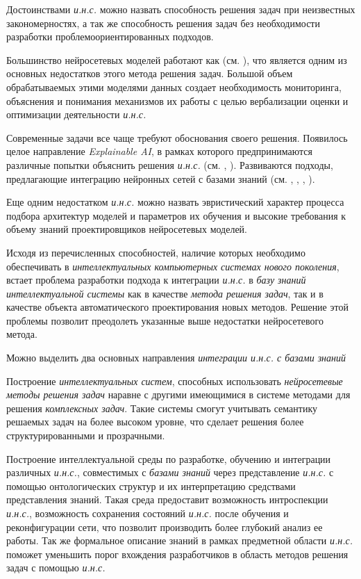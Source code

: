 Достоинствами \textit{и.н.с.} можно назвать способность решения задач при неизвестных закономерностях, а так же способность решения задач без необходимости разработки проблемоориентированных подходов.

Большинство нейросетевых моделей работают как  (см. ), что является одним из основных недостатков этого метода решения задач. Большой объем обрабатываемых этими моделями данных создает необходимость мониторинга, объяснения и понимания механизмов их работы с целью вербализации оценки и оптимизации деятельности \textit{и.н.с.}

Современные задачи все чаще требуют обоснования своего решения. Появилось целое направление \textit{Explainable AI}, в рамках которого предпринимаются различные попытки объяснить решения \textit{и.н.с.} (см. , ). Развиваются подходы, предлагающие интеграцию нейронных сетей с базами знаний (см. , , , ).

Еще одним недостатком \textit{и.н.с.} можно назвать эвристический характер процесса подбора архитектур моделей и параметров их обучения и высокие требования к объему знаний проектировщиков нейросетевых моделей.

Исходя из перечисленных способностей, наличие которых необходимо обеспечивать в \textit{интеллектуальных компьютерных системах нового поколения}, встает проблема разработки подхода к интеграции \textit{и.н.с.} в \textit{базу знаний} \textit{интеллектуальной системы} как в качестве \textit{метода решения задач}, так и в качестве объекта автоматического проектирования новых методов. Решение этой проблемы позволит преодолеть указанные выше недостатки нейросетевого метода.

Можно выделить два основных направления \textit{интеграции и.н.с. с базами знаний} \:
\begin{textitemize}
	\item Построение \textit{интеллектуальных систем}, способных использовать \textit{нейросетевые методы решения задач} наравне с другими имеющимися в системе методами для решения \textit{комплексных задач}. Такие системы смогут учитывать семантику решаемых задач на более высоком уровне, что сделает решения более структурированными и прозрачными.
	\item Построение интеллектуальной среды по разработке, обучению и интеграции различных \textit{и.н.с.}, совместимых с \textit{базами знаний} через представление \textit{и.н.с.} с помощью онтологических структур и их интерпретацию средствами представления знаний. Такая среда предоставит возможность интроспекции \textit{и.н.с.}, возможность сохранения состояний \textit{и.н.с.} после обучения и реконфигурации сети, что позволит производить более глубокий анализ ее работы. Так же формальное описание знаний в рамках предметной области \textit{и.н.с.} поможет уменьшить порог вхождения разработчиков в область методов решения задач с помощью \textit{и.н.с.}
\end{textitemize}


